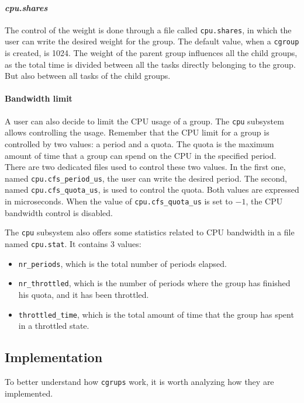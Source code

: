 \paragraph{\textit{cpu.shares}}
The control of the weight is done through a file called \verb|cpu.shares|, in which the user can write the desired weight for the group. The default value, when a \verb|cgroup| is created, is 1024. The weight of the parent group influences all the child groups, as the total time is divided between all the tasks directly belonging to the group. But also between all tasks of the child groups.

\paragraph{Bandwidth limit}
A user can also decide to limit the CPU usage of a group. The \verb|cpu| subsystem allows controlling the usage. Remember that the CPU limit for a group is controlled by two values: a period and a quota. The quota is the maximum amount of time that a group can spend on the CPU in the specified period.  There are two dedicated files used to control these two values. In the first one, named \verb|cpu.cfs_period_us|, the user can write the desired period. The second, named \verb|cpu.cfs_quota_us|, is used to control the quota. Both values are expressed in microseconds. When the value of \verb|cpu.cfs_quota_us| is set to $-1$, the CPU bandwidth control is disabled.

The \verb|cpu| subsystem also offers some statistics related to CPU bandwidth in a file named \verb|cpu.stat|. It contains 3 values:
\begin{itemize}
    \item \verb|nr_periods|, which is the total number of periods elapsed.
    \item \verb|nr_throttled|, which is the number of periods where the group has finished his quota, and it has been throttled.
    \item \verb|throttled_time|, which is the total amount of time that the group has spent in a throttled state.
\end{itemize}


\subsection{Implementation}

To better understand how \verb|cgrups| work, it is worth analyzing how they are implemented.

